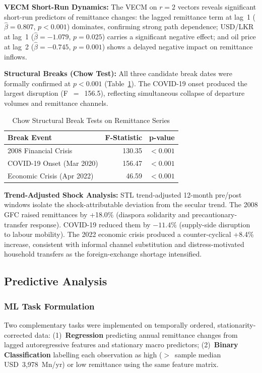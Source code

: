 \documentclass[sigconf]{acmart}
\begin{document}
\noindent\textbf{VECM Short-Run Dynamics:}
The VECM on $r=2$ vectors reveals significant short-run predictors of remittance changes: the lagged remittance term at lag~1 ($\hat{\beta}=0.807$, $p<0.001$) dominates, confirming strong path dependence; USD/LKR at lag~1 ($\hat{\beta}=-1.079$, $p=0.025$) carries a significant negative effect; and oil price at lag~2 ($\hat{\beta}=-0.745$, $p=0.001$) shows a delayed negative impact on remittance inflows.

\noindent\textbf{Structural Breaks (Chow Test):}
All three candidate break dates were formally confirmed at $p<0.001$ (Table~\ref{tab:chow}). The COVID-19 onset produced the largest disruption (F~$=$~156.5), reflecting simultaneous collapse of departure volumes and remittance channels.

\begin{table}[h]
\centering
\caption{Chow Structural Break Tests on Remittance Series}
\label{tab:chow}
\small
\begin{tabular}{lrr}
\toprule
\textbf{Break Event} & \textbf{F-Statistic} & \textbf{p-value} \\
\midrule
2008 Financial Crisis      & 130.35 & $<0.001$ \\
COVID-19 Onset (Mar 2020)  & 156.47 & $<0.001$ \\
Economic Crisis (Apr 2022) &  46.59 & $<0.001$ \\
\bottomrule
\end{tabular}
\end{table}

\noindent\textbf{Trend-Adjusted Shock Analysis:}
STL trend-adjusted 12-month pre/post windows isolate the shock-attributable deviation from the secular trend. The 2008 GFC raised remittances by +18.0\% (diaspora solidarity and precautionary-transfer response). COVID-19 reduced them by $-11.4\%$ (supply-side disruption to labour mobility). The 2022 economic crisis produced a counter-cyclical +8.4\% increase, consistent with informal channel substitution and distress-motivated household transfers as the foreign-exchange shortage intensified.

\subsection{Predictive Analysis}

\subsubsection{ML Task Formulation}
Two complementary tasks were implemented on temporally ordered, stationarity-corrected data: (1)~\textbf{Regression} predicting annual remittance changes from lagged autoregressive features and stationary macro predictors; (2)~\textbf{Binary Classification} labelling each observation as high ($>$~sample median USD~3,978~Mn/yr) or low remittance using the same feature matrix. 
\end{document}
